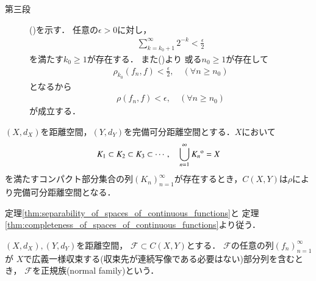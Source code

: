 \begin{prf}
\begin{description}
			\item[第三段]
				()を示す．
				任意の$\epsilon > 0$に対し，
				\begin{align}
					\sum_{k=k_0+1}^\infty 2^{-k} < \frac{\epsilon}{2}
				\end{align}
				を満たす$k_0 \geq 1$が存在する．
				また()より
				或る$n_0 \geq 1$が存在して
				\begin{align}
					\rho_{k_0}(f_n,f) < \frac{\epsilon}{2},
					\quad (\forall n \geq n_0)
				\end{align}
				となるから
				\begin{align}
					\rho(f_n,f) < \epsilon, \quad (\forall n \geq n_0)
				\end{align}
				が成立する．
				\QED
		\end{description}
	\end{prf}
	
	\begin{screen}
		\begin{thm}[$C(X,Y)$の完備可分性]\label{thm:appendix_complete_separability_of_spaces_of_continuous_functions}
			$(X,d_X)$を距離空間，$(Y,d_Y)$を完備可分距離空間とする．$X$において
			\begin{align}
				K_1 \subset K_2 \subset K_3 \subset \cdots,
				\quad \bigcup_{n=1}^\infty {\kern0ptK_n}^{\mathrm{o}} = X
			\end{align}
			を満たすコンパクト部分集合の列$(K_n)_{n=1}^\infty$が存在するとき，$C(X,Y)$は$\rho$により完備可分距離空間となる．
		\end{thm}
	\end{screen}
	
	\begin{prf}
		定理\ref{thm:separability_of_spaces_of_continuous_functions}と
		定理\ref{thm:completeness_of_spaces_of_continuous_functions}より従う．
		\QED
	\end{prf}
	
	\begin{screen}
		\begin{dfn}[正規族]
			$(X,d_X),(Y,d_Y)$を距離空間，
			$\mathscr{F} \subset C(X,Y)$とする．
			$\mathscr{F}$の任意の列$(f_n)_{n=1}^\infty$が
			$X$で広義一様収束する(収束先が連続写像である必要はない)部分列を含むとき，
			$\mathscr{F}$を正規族(normal family)という．
		\end{dfn}
	\end{screen}
	
